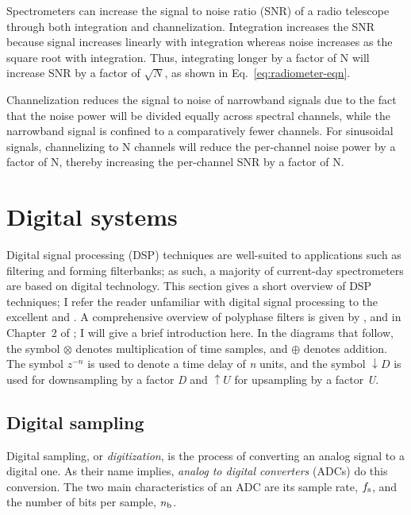 \documentclass{ws-rv961x669}
\begin{document}
Spectrometers can increase the signal to noise ratio (SNR) of a radio telescope through both integration and channelization. Integration increases the SNR because signal increases linearly with integration whereas noise increases as the square root with integration. Thus, integrating longer by a factor of N will increase SNR by a factor of $\sqrt{N}$, as shown in Eq.~\ref{eq:radiometer-eqn}.

Channelization reduces the signal to noise of narrowband signals due to the fact that the noise power will be divided equally across spectral channels, while the narrowband signal is confined to a comparatively fewer channels. For sinusoidal signals, channelizing to N channels will reduce the per-channel noise power by a factor of N, thereby increasing the per-channel SNR by a factor of N.


\section{Digital systems}

Digital signal processing (DSP) techniques are well-suited to applications such as filtering and forming filterbanks; as such, a majority of current-day spectrometers are based on digital technology. This section gives a short overview of DSP techniques; I refer the reader unfamiliar with digital signal processing to the excellent \citet{bookLyonsDSP} and \citet{BookSmithDSP}. A comprehensive overview of polyphase filters is given by \citet{Vaidyanathan:1990p6127}, and in Chapter~2 of \citet{BookHarrisMultirateDSP}; I will give a brief introduction here. In the diagrams that follow, the symbol $\otimes$ denotes multiplication of time samples, and $\oplus$ denotes addition. The symbol $z^{-n}$ is used to denote a time delay of \emph{n} units, and the symbol $\downarrow D$ is used for downsampling by a factor \emph{D} and $\uparrow U$ for upsampling by a factor \emph{U}.

\subsection{Digital sampling}

Digital sampling, or \emph{digitization}, is the process of converting an analog signal to a digital one. As their name implies, \emph{analog to digital converters} (ADCs) do this conversion. The two main characteristics of an ADC are its sample rate, $f_{\rm{s}}$, and the number of bits per sample, $n_{\rm{b}}$.
\end{document}
